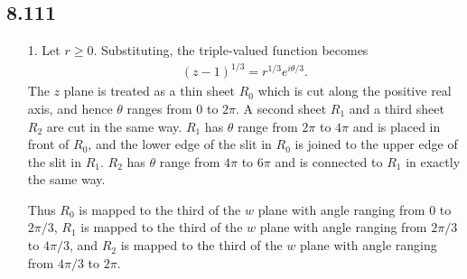 \documentclass[a4paper,12pt]{article}
\begin{document}
\subsection*{8.111}
\begin{enumerate}
    \item[1.]
        Let $r \geq 0$. Substituting, the triple-valued function becomes
        \begin{align*}
            (z - 1)^{1/3} = r^{1/3} e^{i\theta/3}.
        \end{align*}
        The $z$ plane is treated as a thin sheet $R_0$ which is cut along the positive real axis, and hence $\theta$ ranges from $0$ to $2\pi$. A second sheet $R_1$ and a third sheet $R_2$ are cut in the same way. $R_1$ has $\theta$ range from $2\pi$ to $4\pi$ and is placed in front of $R_0$, and the lower edge of the slit in $R_0$ is joined to the upper edge of the slit in $R_1$. $R_2$ has $\theta$ range from $4\pi$ to $6\pi$ and is connected to $R_1$ in exactly the same way. \par
    Thus $R_0$ is mapped to the third of the $w$ plane with angle ranging from $0$ to $2\pi/3$, $R_1$ is mapped to the third of the $w$ plane with angle ranging from $2\pi/3$ to $4\pi/3$, and $R_2$ is mapped to the third of the $w$ plane with angle ranging from $4\pi/3$ to $2\pi$.
\end{enumerate}
\end{document}
